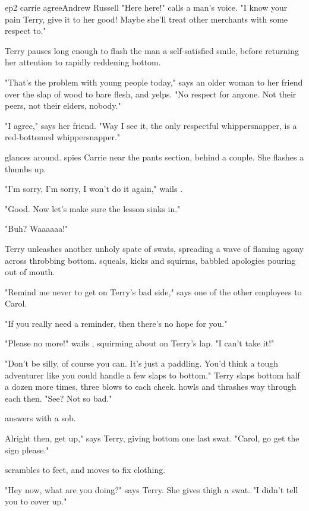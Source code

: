 \documentclass{book}
\begin{document}
\begin{childnode}{ep2 carrie agree}{Andrew Russell}
     "Here here!" calls a man's voice. "I know your pain Terry, give it to her good! Maybe she'll treat other merchants with some respect to."

     Terry pauses long enough to flash the man a self-satisfied smile, before returning her attention to \names{} rapidly reddening bottom.

     "That's the problem with young people today," says an older woman to her friend over the slap of wood to bare flesh, and \names{} yelps. "No respect for anyone. Not their peers, not their
     elders, nobody."

     "I agree," says her friend. "Way I see it, the only respectful whippersnapper, is a red-bottomed whippersnapper."

     \name{} glances around. \HeShe{} spies Carrie near the pants section, behind a couple. She flashes \himher{} a thumbs up.

     "I'm sorry, I'm sorry, I won't do it again," wails \name{}.

     "Good. Now let's make sure the lesson sinks in."

     "Buh? Waaaaaa!"

     Terry unleashes another unholy spate of swats, spreading a wave of flaming agony across \names{} throbbing bottom. \name{} squeals, kicks and squirms, babbled apologies pouring out of \hisher{}
     mouth.

     "Remind me never to get on Terry's bad side," says one of the other employees to Carol.

     "If you really need a reminder, then there's no hope for you."

     "Please no more!" wails \name{}, squirming about on Terry's lap. "I can't take it!"

     "Don't be silly, of course you can. It's just a paddling. You'd think a tough adventurer like you could handle a few slaps to \hisher{} bottom." Terry slaps \names{} bottom half a dozen more 
     times, three blows to each cheek. \name{} howls and thrashes \hisher{} way through each then. "See? Not so bad."

     \name{} answers with a sob.
     
     Alright then, get up," says Terry, giving \names{} bottom one last swat. "Carol, go get the sign please."

     \name{} scrambles to \hisher{} feet, and moves to fix \hisher{} clothing.

     "Hey now, what are you doing?" says Terry. She gives \names{} thigh a swat. "I didn't tell you to cover up."


\end{childnode}
\end{document}
